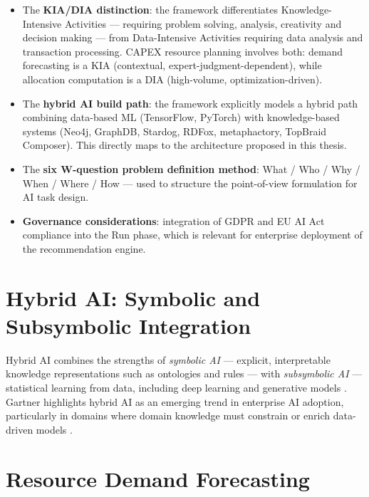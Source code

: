 \begin{itemize}
  \item The \textbf{KIA/DIA distinction}: the framework differentiates Knowledge-Intensive Activities — requiring problem solving, analysis, creativity and decision making — from Data-Intensive Activities requiring data analysis and transaction processing. CAPEX resource planning involves both: demand forecasting is a KIA (contextual, expert-judgment-dependent), while allocation computation is a DIA (high-volume, optimization-driven).
  \item The \textbf{hybrid AI build path}: the framework explicitly models a hybrid path combining data-based ML (TensorFlow, PyTorch) with knowledge-based systems (Neo4j, GraphDB, Stardog, RDFox, metaphactory, TopBraid Composer). This directly maps to the architecture proposed in this thesis.
  \item The \textbf{six W-question problem definition method}: What / Who / Why / When / Where / How — used to structure the point-of-view formulation for AI task design.
  \item \textbf{Governance considerations}: integration of GDPR and EU AI Act compliance into the Run phase, which is relevant for enterprise deployment of the recommendation engine.
\end{itemize}

\section{Hybrid AI: Symbolic and Subsymbolic Integration}
\label{sec:lit_hybrid_ai}

Hybrid AI combines the strengths of \textit{symbolic AI} — explicit, interpretable knowledge representations such as ontologies and rules — with \textit{subsymbolic AI} — statistical learning from data, including deep learning and generative models \citep{garcez2022neurosymbolic}. Gartner highlights hybrid AI as an emerging trend in enterprise AI adoption, particularly in domains where domain knowledge must constrain or enrich data-driven models \citep{gartner2024hype}.


\section{Resource Demand Forecasting}
\label{sec:lit_forecasting}


